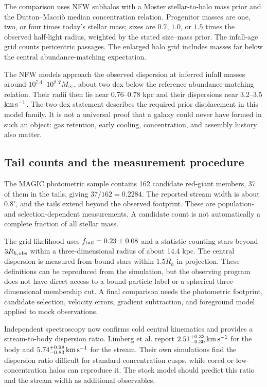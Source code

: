 The comparison uses NFW subhalos with a Moster stellar-to-halo mass prior
and the Dutton--Macci\`o median concentration relation. Progenitor masses
are one, two, or four times today's stellar mass; sizes are $0.7$, $1.0$,
or $1.5$ times the observed half-light radius, weighted by the stated
size--mass prior. The infall-age grid counts pericentric passages.
The enlarged halo grid includes masses far below the central
abundance-matching expectation. \cite{moster,dutton}

The NFW models approach the observed dispersion at inferred infall masses
around $10^{7.4}$--$10^{7.7}M_\odot$, about two dex below the reference
abundance-matching relation. Their radii then lie near 0.76--0.78 kpc and
their dispersions near 3.2--3.5 $\mathrm{km\,s^{-1}}$. The two-dex statement describes
the required prior displacement in this model family. It is not a universal
proof that a galaxy could never have formed in such an object: gas
retention, early cooling, concentration, and assembly history also matter.

\subsection{Tail counts and the measurement procedure}

The MAGIC photometric sample contains 162 candidate red-giant members,
37 of them in the tails, giving $37/162=0.2284$. The reported stream width
is about $0.8^\circ$, and the tails extend beyond the observed footprint.
These are population- and selection-dependent measurements. A candidate
count is not automatically a complete fraction of all stellar mass.
\cite{atzberger}

The grid likelihood uses $f_{\rm tail}=0.23\pm0.08$ and a statistic counting
stars beyond $3R_{h,\rm obs}$ within a three-dimensional radius of about
14.4 kpc. The central dispersion is measured from bound stars within
$1.5R_h$ in projection. These definitions can be reproduced from the
simulation, but the observing program does not have direct access to a
bound-particle label or a spherical three-dimensional membership cut.
A final comparison needs the photometric footprint, candidate selection,
velocity errors, gradient subtraction, and foreground model applied to
mock observations.

Independent spectroscopy now confirms cold central kinematics and
provides a stream-to-body dispersion ratio. Limberg et al. report
$2.51^{+0.33}_{-0.30}\,\mathrm{km\,s^{-1}}$ for the body and
$5.74^{+0.98}_{-0.83}\,\mathrm{km\,s^{-1}}$ for the stream. Their own simulations find
the dispersion ratio difficult for standard-concentration cusps, while
cored or low-concentration halos can reproduce it. The stock model should
predict this ratio and the stream width as additional observables.
\cite{limberg}

